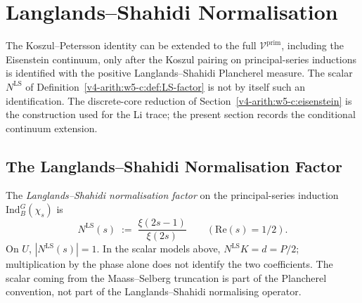 \section{Langlands--Shahidi Normalisation}
\label{v4-arith:w5-c:LS}

The Koszul--Petersson identity can be extended to the full
\(\mathcal{V}^{\mathrm{prim}}\), including the Eisenstein continuum,
only after the Koszul pairing on principal-series inductions is
identified with the positive Langlands--Shahidi Plancherel measure.
The scalar \(N^{\mathrm{LS}}\) of Definition~\ref{v4-arith:w5-c:def:LS-factor}
is not by itself such an identification. The discrete-core reduction
of Section~\ref{v4-arith:w5-c:eisenstein} is the construction used for the
Li trace; the present section records the conditional continuum
extension.

\subsection{The Langlands--Shahidi Normalisation Factor}
\label{v4-arith:w5-c:LS:factor}

\begin{definition}
\label{v4-arith:w5-c:def:LS-factor}
The \emph{Langlands--Shahidi normalisation factor} on the
principal-series induction \(\mathrm{Ind}_{B}^{G}(\chi_{s})\) is
\begin{equation}
\label{v4-arith:w5-c:eq:LS-factor}
N^{\mathrm{LS}}(s)\;:=\;\frac{\xi(2s-1)}{\xi(2s)}\qquad(\mathrm{Re}(s)=1/2).
\end{equation}
On \(U\), \(|N^{\mathrm{LS}}(s)|=1\). In the scalar models above,
\(N^{\mathrm{LS}}K=d=P/2\); multiplication by the phase alone
does not identify the two coefficients. The scalar coming from
the Maass--Selberg truncation is part of the Plancherel convention, not
part of the Langlands--Shahidi normalising operator.
\end{definition}

